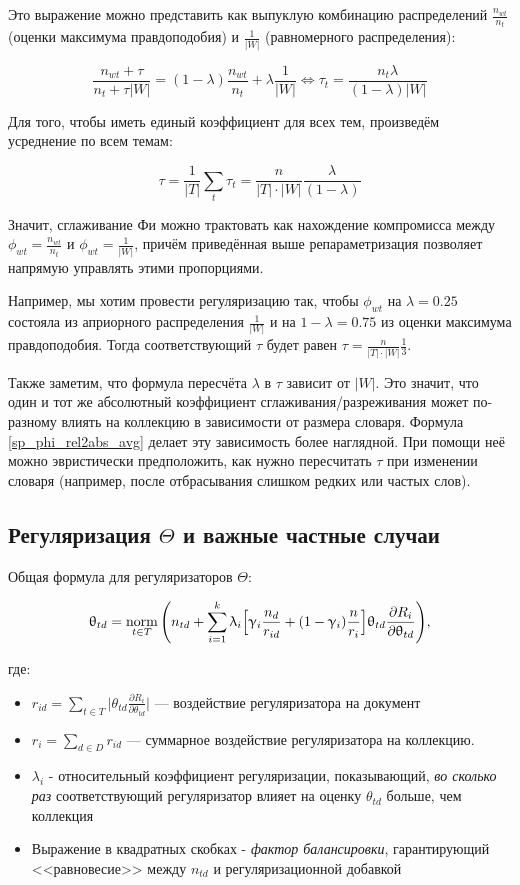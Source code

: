 Это выражение можно представить как выпуклую комбинацию распределений  $\frac{n_{wt}}{n_t}$ (оценки максимума правдоподобия) и $\frac{1}{|W|}$ (равномерного распределения):

\[
\frac{n_{wt} + \tau}{n_{t} + \tau |W|} = (1-\lambda) \frac{n_{wt}}{n_t} + \lambda \frac{1}{|W|} \iff \tau_t  = \frac{n_t \lambda}{(1-\lambda) |W|}
\]

Для того, чтобы иметь единый коэффициент для всех тем, произведём усреднение по всем темам: 

\[
\tau = \frac{1}{|T|} \sum_t \tau_t = \frac{n}{|T|\cdot|W|} \frac{\lambda}{(1-\lambda)}  \label{sp_phi_rel2abs_avg}
\]

Значит, сглаживание Фи можно трактовать как нахождение компромисса между $\phi_{wt} = \frac{n_{wt}}{n_t}$ и $\phi_{wt} = \frac{1}{|W|}$, причём приведённая выше репараметризация позволяет напрямую управлять этими пропорциями.

Например, мы хотим провести регуляризацию так, чтобы $\phi_{wt}$ на $\lambda=0.25$ состояла из априорного распределения $\frac{1}{|W|}$ и на $1-\lambda=0.75$ из оценки максимума правдоподобия. Тогда соответствующий $\tau$ будет равен $\tau = \frac{n}{|T|\cdot|W|} \frac1{3}$.

Также заметим, что формула пересчёта $\lambda$ в $\tau$ зависит от $|W|$. Это значит, что один и тот же абсолютный коэффициент сглаживания/разреживания может по-разному влиять на коллекцию в зависимости от размера словаря.  Формула \eqref{sp_phi_rel2abs_avg} делает эту зависимость более наглядной. При помощи неё можно эвристически предположить, как нужно пересчитать $\tau$ при изменении словаря (например, после отбрасывания слишком редких или частых слов).

\subsection{Регуляризация $\Theta$ и важные частные случаи}
Общая формула для регуляризаторов $\Theta$:

\[
\uptheta_{td} = \mathop{\mathrm{norm}}\limits_{t \in T} \Bigg(
    n_{td} + \sum_{i=1}^k \uplambda_i \Big[
        \upgamma_i \frac{n_d}{r_{id}} + (1-\upgamma_i)\frac{n}{r_i}
        \Big]
    \uptheta_{td} \frac{\partial R_i}{\partial \uptheta_{td}}
\Bigg), \label{rel_theta_general}
\]

где:

\begin{itemize}
    \item { $r_{id} = \sum_{t\in T} \Big | \theta_{td} \frac{\partial R_i}{\partial \theta_{td}} \Big | $ --- воздействие регуляризатора на документ}
    \item { $r_{i} = \sum_{d\in D} r_{id}$ --- суммарное воздействие регуляризатора на коллекцию.}
    \item { $\lambda_i$ - относительный коэффициент регуляризации, показывающий, \emph{во сколько раз} соответствующий регуляризатор влияет на оценку $\theta_{td}$ больше, чем коллекция}
    \item {Выражение в квадратных скобках - \textit{фактор балансировки}, гарантирующий <<равновесие>> между $n_{td}$ и регуляризационной добавкой}
\end{itemize}

